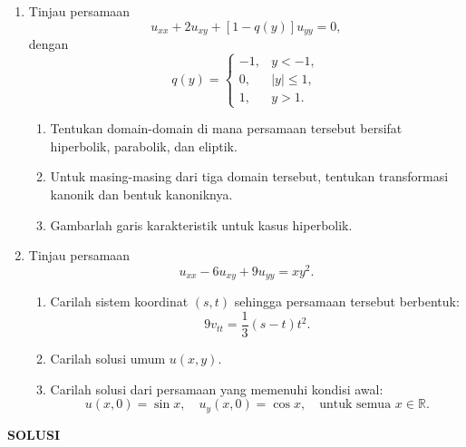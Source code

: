 \documentclass[a4paper]{article}
\theoremstyle{definition}
\begin{document}
\pagestyle{fancy}
\begin{enumerate}
  \item Tinjau persamaan
\[
u_{xx} + 2u_{xy} + [1 - q(y)]u_{yy} = 0,
\]
dengan
\[
q(y) = 
\begin{cases}
-1, & y < -1, \\
0, & |y| \leq 1, \\
1, & y > 1.
\end{cases}
\]

\begin{enumerate}
  \item Tentukan domain-domain di mana persamaan tersebut bersifat hiperbolik, parabolik, dan eliptik.
  \item Untuk masing-masing dari tiga domain tersebut, tentukan transformasi kanonik dan bentuk kanoniknya.
  \item Gambarlah garis karakteristik untuk kasus hiperbolik.
\end{enumerate}
  \item Tinjau persamaan
  \[
u_{xx} - 6u_{xy} + 9u_{yy} = x y^2.
\]

\begin{enumerate}
  \item Carilah sistem koordinat \( (s, t) \) sehingga persamaan tersebut berbentuk:
  \[
  9v_{tt} = \frac{1}{3}(s - t)t^2.
  \]
  
  \item Carilah solusi umum \( u(x, y) \).
  \item Carilah solusi dari persamaan yang memenuhi kondisi awal:
  \[
  u(x, 0) = \sin x, \quad u_y(x, 0) = \cos x, \quad \text{untuk semua } x \in \mathbb{R}.
  \]
\end{enumerate}

  
\end{enumerate}
\newpage
\begin{center}
\textbf{SOLUSI}
\end{center}
\end{document}
